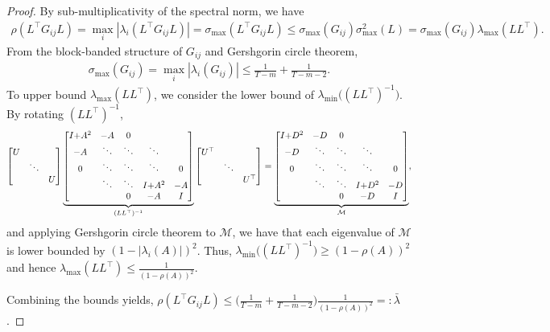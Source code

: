 \documentclass[11pt]{article}
\begin{document}
\begin{proof}
\noindent By sub-multiplicativity of the spectral norm, we have
\begin{align*}
    \rho(L^\top G_{ij} L) = \max_i |\lambda_i(L^\top G_{ij} L)|   = \sigma_{\max} (L^\top G_{ij} L) \le \sigma_{\max}(G_{ij}) \sigma_{\max}^2(L) = \sigma_{\max}(G_{ij}) \lambda_{\max}(LL^\top). 
\end{align*}
From the block-banded structure of $G_{ij}$ and Gershgorin circle theorem,
\begin{align*}
    \sigma_{\max}(G_{ij}) = \max_{i} |\lambda_i(G_{ij})| \le \frac{1}{T-m} + \frac{1}{T-m-2}.
\end{align*}
To upper bound $\lambda_{\max}(LL^\top)$, we consider the lower bound of $\lambda_{\min}\big((LL^\top)^{-1}\big)$. By rotating $(LL^\top)^{-1}$, 
\begin{align*}
\setlength{\arraycolsep}{5pt}
    \begin{bmatrix}
        U & & \\
         & \ddots & \\
         & & U
    \end{bmatrix} 
    \underbrace{\begin{bmatrix}
       I{+}A^2 & -A &    0    \\
       -A & \ddots & \ddots & \ddots \\
          0     & \ddots & \ddots & \ddots & 0  \\
                  & \ddots & \ddots & I{+}A^2  & -A\\
                &        &     0     &-A & I 
    \end{bmatrix}}_{(LL^\top)^{-1}}  
    \begin{bmatrix}
        U^\top & & \\
         & \ddots & \\
         & & U^\top
    \end{bmatrix}  =  \underbrace{\begin{bmatrix}
        I{+}D^2 & -D &    0    \\
       -D & \ddots & \ddots & \ddots \\
          0     & \ddots & \ddots & \ddots & 0  \\
                  & \ddots & \ddots & I{+}D^2  & -D\\
                &        &     0     & -D & I
    \end{bmatrix}}_{\mathcal{M}},
\end{align*}
\noindent and applying Gershgorin circle theorem to $\mathcal{M}$, we have that each eigenvalue of $\mathcal{M}$ is lower bounded by $(1-|\lambda_i(A)|)^2$. Thus, $\lambda_{\min}\big((LL^\top)^{-1}\big) \ge (1-\rho(A))^2$ and hence $\lambda_{\max}(LL^\top) \le  \frac{1}{(1-\rho(A))^2}$. 

Combining the bounds yields, $\rho(L^\top G_{ij} L) \le \Big( \frac{1}{T-m} + \frac{1}{T-m-2} \Big) \frac{1}{(1-\rho(A))^2} =: \bar{\lambda}$. \qedhere
\end{proof}
\end{document}
